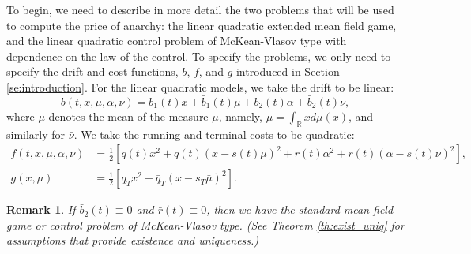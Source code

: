 \documentclass[11pt]{article}
\newtheorem{remark}{Remark}
\begin{document}
To begin, we need to describe in more detail the two problems that will be used to compute the price of anarchy: the linear quadratic extended mean field game, and the linear quadratic control problem of McKean-Vlasov type with dependence on the law of the control. To specify the problems, we only need to specify the drift and cost functions, $b$, $f$, and $g$ introduced in Section \ref{se:introduction}. For the linear quadratic models, we take the drift to be linear:
\begin{equation*}
    b(t,x,\mu,\alpha,\nu)=b_1(t)x+\bar{b}_1(t) \bar{\mu}+b_2(t) \alpha+\bar{b}_2(t) \bar{\nu},
\end{equation*}
where $\bar{\mu}$ denotes the mean of the measure $\mu$, namely, $\bar{\mu}=\int_{\mathbb{R}}xd\mu(x)$, and similarly for $\bar{\nu}$. We take the running and terminal costs to be quadratic:
\begin{equation*}
\begin{split}
    f(t,x,\mu,\alpha,\nu)&=\frac{1}{2}\left[q(t)x^2+\bar{q}(t)(x-s(t)\bar{\mu})^2 +r(t)\alpha^2+\bar{r}(t)(\alpha-\bar{s}(t)\bar{\nu})^2\right], \\
    g(x,\mu)&=\frac{1}{2}\left[q_T x^2+\bar{q}_T (x-s_T \bar{\mu})^2\right].
\end{split}
\end{equation*}
\begin{remark}
If $\bar{b}_2(t)\equiv0$ and $\bar{r}(t)\equiv0$, then we have the standard mean field game or control problem of McKean-Vlasov type. (See Theorem \ref{th:exist_uniq} for assumptions that provide existence and uniqueness.)
\label{remark_2}
\end{remark}
\end{document}
